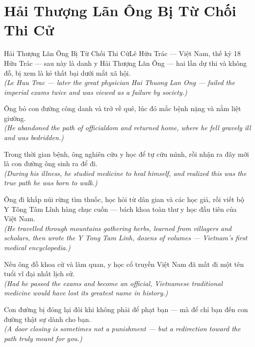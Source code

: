\section{Hải Thượng Lãn Ông Bị Từ Chối Thi Cử}
\begin{truyen}{Hải Thượng Lãn Ông Bị Từ Chối Thi Cử}{Lê Hữu Trác --- Việt Nam, thế kỷ 18}
 Hữu Trác --- sau này là danh y Hải Thượng Lãn Ông --- hai lần dự thi và không đỗ, bị xem là kẻ thất bại dưới mắt xã hội.\\[4pt]
\textit{(Le Huu Trac --- later the great physician Hai Thuong Lan Ong --- failed the imperial exams twice and was viewed as a failure by society.)}

Ông bỏ con đường công danh và trở về quê, lúc đó mắc bệnh nặng và nằm liệt giường.\\[4pt]
\textit{(He abandoned the path of officialdom and returned home, where he fell gravely ill and was bedridden.)}

Trong thời gian bệnh, ông nghiên cứu y học để tự cứu mình, rồi nhận ra đây mới là con đường ông sinh ra để đi.\\[4pt]
\textit{(During his illness, he studied medicine to heal himself, and realized this was the true path he was born to walk.)}

Ông đi khắp núi rừng tìm thuốc, học hỏi từ dân gian và các học giả, rồi viết bộ Y Tông Tâm Lĩnh hàng chục cuốn --- bách khoa toàn thư y học đầu tiên của Việt Nam.\\[4pt]
\textit{(He travelled through mountains gathering herbs, learned from villagers and scholars, then wrote the Y Tong Tam Linh, dozens of volumes --- Vietnam's first medical encyclopedia.)}

Nếu ông đỗ khoa cử và làm quan, y học cổ truyền Việt Nam đã mất đi một tên tuổi vĩ đại nhất lịch sử.\\[4pt]
\textit{(Had he passed the exams and become an official, Vietnamese traditional medicine would have lost its greatest name in history.)}

\end{truyen}
\begin{baihoc}
  Con đường bị đóng lại đôi khi không phải để phạt bạn --- mà để chỉ bạn đến con đường thật sự dành cho bạn.\\[4pt]
  \textit{(A door closing is sometimes not a punishment --- but a redirection toward the path truly meant for you.)}
\end{baihoc}

